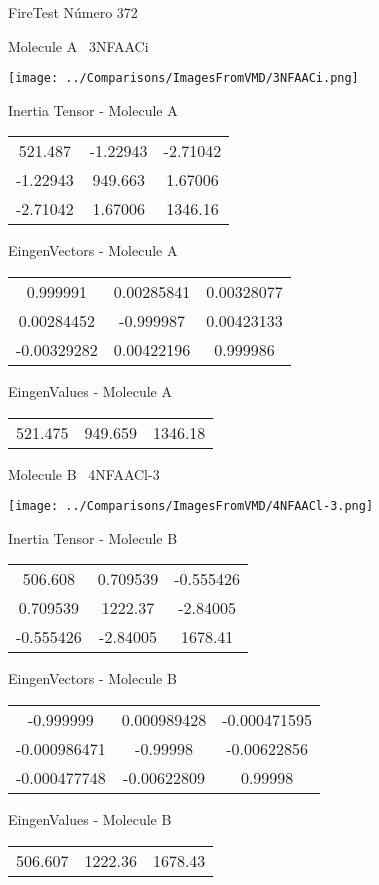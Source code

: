 \vtab[-3cm]
\begin{center}
{\large FireTest \tab Número 372}
\end{center}
\begin{multicols}{2}
\begin{center}

Molecule A \
3NFAACi

\texttt{[image: ../Comparisons/ImagesFromVMD/3NFAACi.png]}

Inertia Tensor - Molecule A \\
\begin{tabular}{|c c c|}
521.487	 & 	-1.22943	 & 	-2.71042	 \\
-1.22943	 & 	949.663	 & 	1.67006	 \\
-2.71042	 & 	1.67006	 & 	1346.16
\end{tabular}

\vtab
 EingenVectors - Molecule A     \\
\begin{tabular}{|c c c|}
0.999991	 & 	0.00285841	 & 	0.00328077	 \\
0.00284452	 & 	-0.999987	 & 	0.00423133	 \\
-0.00329282	 & 	0.00422196	 & 	0.999986
\end{tabular}

\vtab
 EingenValues - Molecule A     \\
\begin{tabular}{|c c c|}
521.475	 & 	949.659	 & 	1346.18	 \\
\end{tabular}
\columnbreak

Molecule B \
4NFAACl-3

\texttt{[image: ../Comparisons/ImagesFromVMD/4NFAACl-3.png]}

Inertia Tensor - Molecule B \\
\begin{tabular}{|c c c|}
506.608	 & 	0.709539	 & 	-0.555426	 \\
0.709539	 & 	1222.37	 & 	-2.84005	 \\
-0.555426	 & 	-2.84005	 & 	1678.41
\end{tabular}

\vtab
 EingenVectors - Molecule B     \\
\begin{tabular}{|c c c|}
-0.999999	 & 	0.000989428	 & 	-0.000471595	 \\
-0.000986471	 & 	-0.99998	 & 	-0.00622856	 \\
-0.000477748	 & 	-0.00622809	 & 	0.99998
\end{tabular}

\vtab
 EingenValues - Molecule B     \\
\begin{tabular}{|c c c|}
506.607	 & 	1222.36	 & 	1678.43	 \\
\end{tabular}

\end{center}
\end{multicols}

